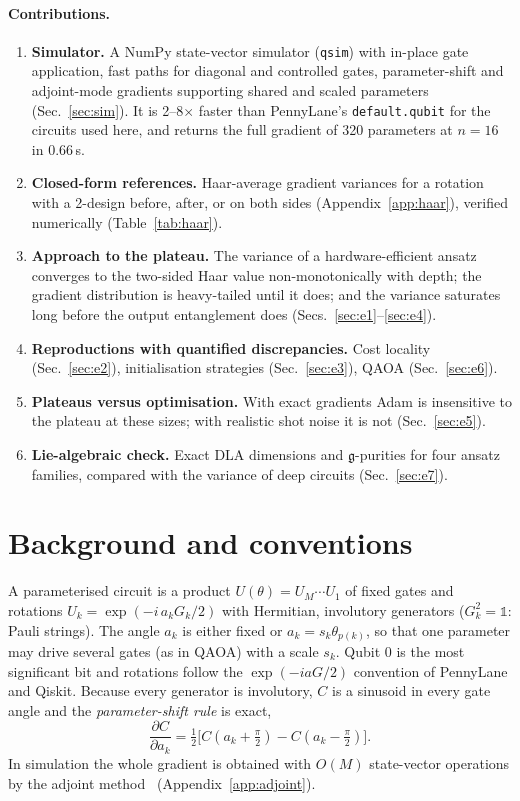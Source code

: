 \documentclass[11pt]{article}
\newcommand{\g}{\mathfrak{g}}
\begin{document}
\paragraph{Contributions.}
\begin{enumerate}
  \item \textbf{Simulator.} A NumPy state-vector simulator (\texttt{qsim}) with in-place gate application, fast paths for diagonal and controlled gates, parameter-shift and adjoint-mode gradients supporting shared and scaled parameters (Sec.~\ref{sec:sim}). It is 2--8$\times$ faster than PennyLane's \texttt{default.qubit} for the circuits used here, and returns the full gradient of 320 parameters at $n=16$ in $0.66$\,s.
  \item \textbf{Closed-form references.} Haar-average gradient variances for a rotation with a 2-design before, after, or on both sides (Appendix~\ref{app:haar}), verified numerically (Table~\ref{tab:haar}).
  \item \textbf{Approach to the plateau.} The variance of a hardware-efficient ansatz converges to the two-sided Haar value non-monotonically with depth; the gradient distribution is heavy-tailed until it does; and the variance saturates long before the output entanglement does (Secs.~\ref{sec:e1}--\ref{sec:e4}).
  \item \textbf{Reproductions with quantified discrepancies.} Cost locality (Sec.~\ref{sec:e2}), initialisation strategies (Sec.~\ref{sec:e3}), QAOA (Sec.~\ref{sec:e6}).
  \item \textbf{Plateaus versus optimisation.} With exact gradients Adam is insensitive to the plateau at these sizes; with realistic shot noise it is not (Sec.~\ref{sec:e5}).
  \item \textbf{Lie-algebraic check.} Exact DLA dimensions and $\g$-purities for four ansatz families, compared with the variance of deep circuits (Sec.~\ref{sec:e7}).
\end{enumerate}

\section{Background and conventions}
\label{sec:background}

A parameterised circuit is a product $U(\theta)=U_M\cdots U_1$ of fixed gates and rotations $U_k=\exp(-i\,a_k G_k/2)$ with Hermitian, involutory generators ($G_k^2=\mathbb 1$: Pauli strings). The angle $a_k$ is either fixed or $a_k=s_k\theta_{p(k)}$, so that one parameter may drive several gates (as in QAOA) with a scale $s_k$. Qubit $0$ is the most significant bit and rotations follow the $\exp(-iaG/2)$ convention of PennyLane and Qiskit. Because every generator is involutory, $C$ is a sinusoid in every gate angle and the \emph{parameter-shift rule} is exact,
\begin{equation}
  \frac{\partial C}{\partial a_k} = \tfrac12\big[C(a_k+\tfrac\pi2)-C(a_k-\tfrac\pi2)\big].
  \label{eq:pshift}
\end{equation}
In simulation the whole gradient is obtained with $O(M)$ state-vector operations by the adjoint method~\cite{jones2020} (Appendix~\ref{app:adjoint}).
\end{document}
